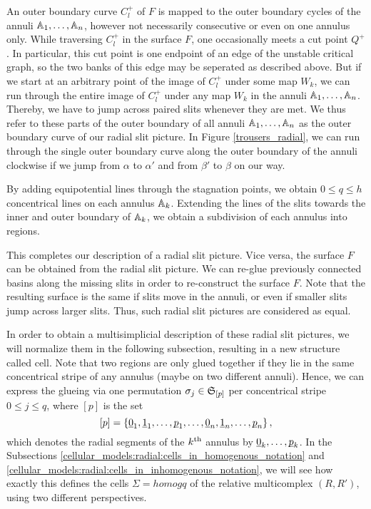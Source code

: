 An outer boundary curve $C^+_l$ of $F$ is mapped to the outer boundary cycles of the annuli $\mathbb A_1, \dotsc, \mathbb A_n$,
however not necessarily consecutive or even on one annulus only.
While traversing $C^+_l$ in the surface $F$, one occasionally meets a cut point $Q^+$. 
In particular, this cut point is one endpoint of an edge of the unstable critical graph, so the two banks of this edge may be seperated as described above.
But if we start at an arbitrary point of the image of $C^+_l$ under some map $W_k$,
we can run through the entire image of $C^+_l$ under any map $W_k$ in the annuli $\mathbb A_1, \dotsc, \mathbb A_n$.
Thereby, we have to jump across paired slits whenever they are met.
We thus refer to these parts of the outer boundary of all annuli $\mathbb A_1, \dotsc, \mathbb A_n$ as the outer boundary curve of our radial slit picture.
In Figure \ref{trousers_radial}, we can run through the single outer boundary curve along the outer boundary of the annuli clockwise
if we jump from $\alpha$ to $\alpha'$ and from $\beta'$ to $\beta$ on our way.

By adding equipotential lines through the stagnation points, 
we obtain $0 \leq q \leq h$ concentrical lines on each annulus $\mathbb A_k$.
Extending the lines of the slits towards the inner and outer boundary of $\mathbb A_k$,
we obtain a subdivision of each annulus into regions.

This completes our description of a radial slit picture.
Vice versa, the surface $F$ can be obtained from the radial slit picture.  
We can re-glue previously connected basins along the missing slits in order to re-construct the surface $F$.
Note that the resulting surface is the same if slits move in the annuli, or even if smaller slits jump across larger slits.
Thus, such radial slit pictures are considered as equal.

In order to obtain a multisimplicial description of these radial slit pictures, 
we will normalize them in the following subsection, resulting in a new structure called cell.
Note that two regions are only glued together if they lie in the same concentrical stripe of any annulus (maybe on two different annuli).
Hence, we can express the glueing via one permutation $\sigma_j \in \mathfrak S_{[p]}$ per concentrical stripe $0 \leq j \leq q$,
where $[p]$ is the set
\[
[p] = \{ \ul 0_1, \ul 1_1, \ldots, \ul p_1, \ldots, \ul 0_n, \ul 1_n, \ldots, \ul p_n \}\,,
\]
which denotes the radial segments of the $k^{\text{th}}$ annulus by $\underline{\smash{0}}_k, \dotsc, \underline{\smash{p}}_k$.
In the Subsections \ref{cellular_models:radial:cells_in_homogenous_notation} and \ref{cellular_models:radial:cells_in_inhomogenous_notation},
we will see how exactly this defines the cells $\Sigma = homogq$ of the relative multicomplex $(R, R')$, using two different perspectives.


